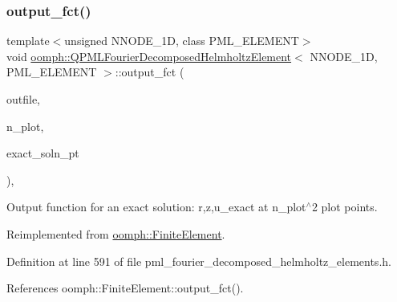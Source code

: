 \subsubsection{\texorpdfstring{output\+\_\+fct()}{output\_fct()}\hspace{0.1cm}{\footnotesize\ttfamily [1/2]}}
{\footnotesize\ttfamily template$<$unsigned N\+N\+O\+D\+E\+\_\+1D, class P\+M\+L\+\_\+\+E\+L\+E\+M\+E\+NT$>$ \\
void \hyperlink{classoomph_1_1QPMLFourierDecomposedHelmholtzElement}{oomph\+::\+Q\+P\+M\+L\+Fourier\+Decomposed\+Helmholtz\+Element}$<$ N\+N\+O\+D\+E\+\_\+1D, P\+M\+L\+\_\+\+E\+L\+E\+M\+E\+NT $>$\+::output\+\_\+fct (\begin{DoxyParamCaption}\item[{std\+::ostream \&}]{outfile,  }\item[{const unsigned \&}]{n\+\_\+plot,  }\item[{\hyperlink{classoomph_1_1FiniteElement_a690fd33af26cc3e84f39bba6d5a85202}{Finite\+Element\+::\+Steady\+Exact\+Solution\+Fct\+Pt}}]{exact\+\_\+soln\+\_\+pt }\end{DoxyParamCaption})\hspace{0.3cm}{\ttfamily [inline]}, {\ttfamily [virtual]}}



Output function for an exact solution\+: r,z,u\+\_\+exact at n\+\_\+plot$^\wedge$2 plot points. 



Reimplemented from \hyperlink{classoomph_1_1FiniteElement_a22b695c714f60ee6cd145be348042035}{oomph\+::\+Finite\+Element}.



Definition at line 591 of file pml\+\_\+fourier\+\_\+decomposed\+\_\+helmholtz\+\_\+elements.\+h.



References oomph\+::\+Finite\+Element\+::output\+\_\+fct().

\mbox{\label{classoomph_1_1QPMLFourierDecomposedHelmholtzElement_a7fa77af72f24908212f80b3fa1519441}} 
